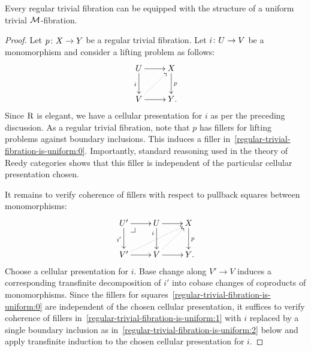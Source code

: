 \documentclass[reqno,10pt,a4paper,oneside,draft]{amsart}
\begin{document}
\begin{proposition} \label{regular-trivial-fibration-to-uniform}
Every regular trivial fibration can be equipped with the structure of a uniform trivial $\cal{M}$-fibration.
\end{proposition}

\begin{proof}
Let $p \co X \to Y$ be a regular trivial fibration.
Let $i \co U \to V$ be a monomorphism and consider a lifting problem as follows:
\begin{equation} \label{regular-trivial-fibration-is-uniform:0}
\xycenter{
  U
  \ar[d]_{i}
  \ar[r]
&
  X
  \ar[d]^{p}
\\
  V
  \ar[r]
  \ar@{.>}[ur]
&
  Y
\rlap{.}}
\end{equation}
Since $\R$ is elegant, we have a cellular presentation for $i$ as per the preceding discussion.
As a regular trivial fibration, note that $p$ has fillers for lifting problems against boundary inclusions.
This induces a filler in~\eqref{regular-trivial-fibration-is-uniform:0}.
Importantly, standard reasoning used in the theory of Reedy categories shows that this filler is independent of the particular cellular presentation chosen.

It remains to verify coherence of fillers with respect to pullback squares between monomorphisms:
\begin{equation} \label{regular-trivial-fibration-is-uniform:1}
\xycenter{
  U'
  \ar[d]_{i'}
  \ar[r]
  \pullback{dr}
&
  U
  \ar[d]_(0.3){i}
  \ar[r]
&
  X
  \ar[d]^{p}
\\
  V'
  \ar[r]
  \ar@{.>}[urr]
&
  V
  \ar[r]
  \ar@{.>}[ur]
&
  Y
\rlap{.}}
\end{equation}
Choose a cellular presentation for $i$.
Base change along $V' \to V$ induces a corresponding transfinite decomposition of $i'$ into cobase changes of coproducts of monomorphisms.
Since the fillers for squares~\eqref{regular-trivial-fibration-is-uniform:0} are independent of the chosen cellular presentation, it suffices to verify coherence of fillers in~\eqref{regular-trivial-fibration-is-uniform:1} with $i$ replaced by a single boundary inclusion as in~\eqref{regular-trivial-fibration-is-uniform:2} below and apply transfinite induction to the chosen cellular presentation for $i$.


\end{proof}
\end{document}
